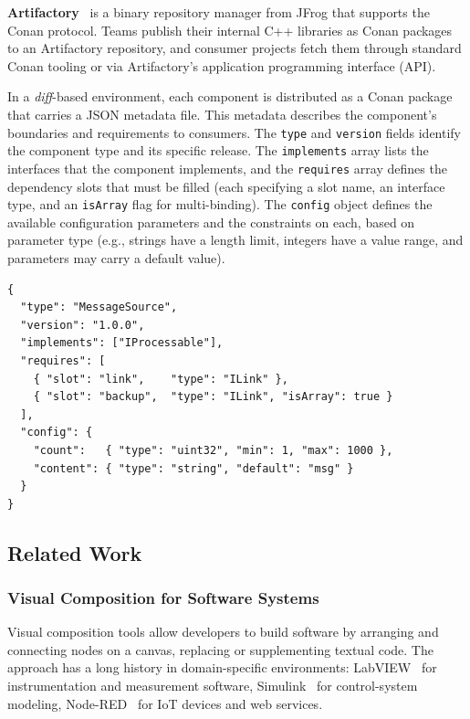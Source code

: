 \textbf{Artifactory}~\cite{artifactory} is a binary repository manager from JFrog that supports the Conan protocol. Teams publish their internal C++ libraries as Conan packages to an Artifactory repository, and consumer projects fetch them through standard Conan tooling or via Artifactory's application programming interface (API).

In a \textit{diff}-based environment, each component is distributed as a Conan package that carries a JSON metadata file. This metadata describes the component's boundaries and requirements to consumers. The \texttt{type} and \texttt{version} fields identify the component type and its specific release. The \texttt{implements} array lists the interfaces that the component implements, and the \texttt{requires} array defines the dependency slots that must be filled (each specifying a slot name, an interface type, and an \texttt{isArray} flag for multi-binding). The \texttt{config} object defines the available configuration parameters and the constraints on
  each, based on parameter type (e.g., strings have a length limit, integers have a value range, and
  parameters may carry a default value).

\begin{lstlisting}[caption={Metadata schema of the \texttt{MessageSource} component.}, label=lst:catalog-entry, aboveskip=10pt]
{
  "type": "MessageSource",
  "version": "1.0.0",
  "implements": ["IProcessable"],
  "requires": [
    { "slot": "link",    "type": "ILink" },
    { "slot": "backup",  "type": "ILink", "isArray": true }
  ],
  "config": {
    "count":   { "type": "uint32", "min": 1, "max": 1000 },
    "content": { "type": "string", "default": "msg" }
  }
}
\end{lstlisting}

\subsection{Related Work}
\label{sec:related-work}

\subsubsection{Visual Composition for Software Systems}

Visual composition tools allow developers to build software by arranging and connecting nodes on a canvas, replacing or supplementing textual code. The approach has a long history in domain-specific environments: LabVIEW~\cite{labview} for instrumentation and measurement software, Simulink~\cite{simulink} for control-system modeling, Node-RED~\cite{nodered} for IoT devices and web services.

